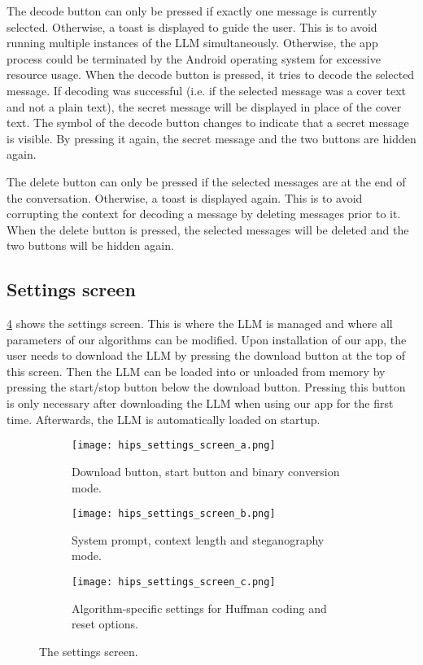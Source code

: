 The decode button can only be pressed if exactly one message is currently selected. Otherwise, a toast is displayed to guide the user. This is to avoid running multiple instances of the \gls{LLM} simultaneously. Otherwise, the app process could be terminated by the Android operating system for excessive resource usage. When the decode button is pressed, it tries to decode the selected message. If decoding was successful (i.e. if the selected message was a cover text and not a plain text), the secret message will be displayed in place of the cover text. The symbol of the decode button changes to indicate that a secret message is visible. By pressing it again, the secret message and the two buttons are hidden again.

The delete button can only be pressed if the selected messages are at the end of the conversation. Otherwise, a toast is displayed again. This is to avoid corrupting the context for decoding a message by deleting messages prior to it. When the delete button is pressed, the selected messages will be deleted and the two buttons will be hidden again.

\subsection{Settings screen}
\label{sec:settingsScreen}
\cref{fig:settingsScreen} shows the settings screen. This is where the \gls{LLM} is managed and where all parameters of our algorithms can be modified. Upon installation of our app, the user needs to download the \gls{LLM} by pressing the download button at the top of this screen. Then the \gls{LLM} can be loaded into or unloaded from memory by pressing the start/stop button below the download button. Pressing this button is only necessary after downloading the \gls{LLM} when using our app for the first time. Afterwards, the \gls{LLM} is automatically loaded on startup.

\begin{figure}
	\begin{wide}
		\captionsetup{width=\linewidth}
		\begin{subfigure}{0.3\linewidth}
			\centering
			\texttt{[image: hips\_settings\_screen\_a.png]}
			\caption{Download button, start button and binary conversion mode.}
			\label{fig:settingsScreenA}
		\end{subfigure}
        \hfill
        \begin{subfigure}{0.3\linewidth}
			\centering
			\texttt{[image: hips\_settings\_screen\_b.png]}
			\caption{System prompt, context length and steganography mode.}
			\label{fig:settingsScreenB}
		\end{subfigure}
        \hfill
        \begin{subfigure}{0.3\linewidth}
			\centering
			\texttt{[image: hips\_settings\_screen\_c.png]}
			\caption{Algorithm-specific settings for Huffman coding and reset options.}
			\label{fig:settingsScreenC}
		\end{subfigure}
		\caption[HiPS: Conversation screen]{The settings screen.}
		\label{fig:settingsScreen}
	\end{wide}
\end{figure}

